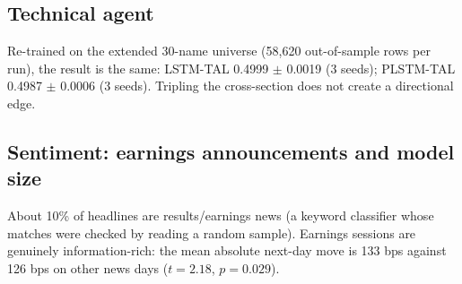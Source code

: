 \documentclass[11pt,a4paper]{article}
\begin{document}
\subsection{Technical agent}
\begin{table}[H]
\centering
\small
\caption{Architecture ablation, core universe: no variant is distinguishable from a coin flip.}\label{tab:arch}
\end{table}

Re-trained on the extended 30-name universe (58,620 out-of-sample rows per run), the result is the same: LSTM-TAL 0.4999 $\pm$ 0.0019 (3 seeds); PLSTM-TAL 0.4987 $\pm$ 0.0006 (3 seeds). Tripling the cross-section does not create a directional edge.
\subsection{Sentiment: earnings announcements and model size}
About 10\% of headlines are results/earnings news (a keyword classifier whose matches were checked by reading a random sample). Earnings sessions are genuinely information-rich: the mean absolute next-day move is 133 bps against 126 bps on other news days ($t=2.18$, $p=0.029$).
\begin{table}[H]
\centering
\small
\caption{Full corpus, Qwen2.5-1.5B: predictability of debiased daily sentiment, earnings vs other sessions. Holm p is adjusted across every cell of the sentiment study.}\label{tab:earn}
\end{table}
\end{document}
